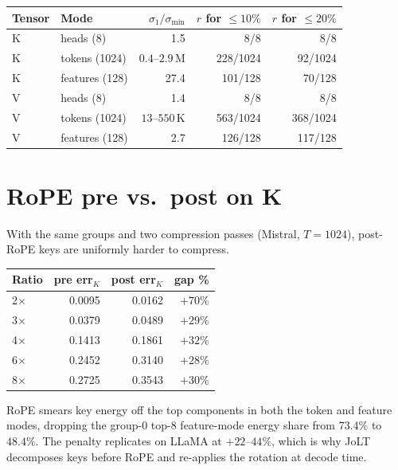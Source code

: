 \documentclass{article}
\begin{document}
\begin{table}[htbp]
  \centering
  \begin{tabular}{llrrr}
    \toprule
    Tensor & Mode & $\sigma_1/\sigma_{\min}$ & $r$ for $\le 10\%$ & $r$ for $\le 20\%$ \\
    \midrule
    K & heads (8)      & 1.5    & 8/8      & 8/8 \\
    K & tokens (1024)  & $0.4$--$2.9$\,M & 228/1024 & 92/1024 \\
    K & features (128) & 27.4   & 101/128  & 70/128 \\
    V & heads (8)      & 1.4    & 8/8      & 8/8 \\
    V & tokens (1024)  & $13$--$550$\,K & 563/1024 & 368/1024 \\
    V & features (128) & 2.7    & 126/128  & 117/128 \\
    \bottomrule
  \end{tabular}
\end{table}

\section{RoPE pre vs.\ post on K}
\label{app:rope}
With the same groups and two compression passes (Mistral, $T{=}1024$), post-RoPE keys are uniformly harder to compress.

\begin{table}[htbp]
  \centering
  \begin{tabular}{lrrr}
    \toprule
    Ratio & pre err$_K$ & post err$_K$ & gap \% \\
    \midrule
    2$\times$ & 0.0095 & 0.0162 & $+70\%$ \\
    3$\times$ & 0.0379 & 0.0489 & $+29\%$ \\
    4$\times$ & 0.1413 & 0.1861 & $+32\%$ \\
    6$\times$ & 0.2452 & 0.3140 & $+28\%$ \\
    8$\times$ & 0.2725 & 0.3543 & $+30\%$ \\
    \bottomrule
  \end{tabular}
\end{table}

RoPE smears key energy off the top components in both the token and feature modes, dropping the group-0 top-8 feature-mode energy share from $73.4\%$ to $48.4\%$. The penalty replicates on LLaMA at $+22$--$44\%$, which is why JoLT decomposes keys before RoPE and re-applies the rotation at decode time.
\end{document}
